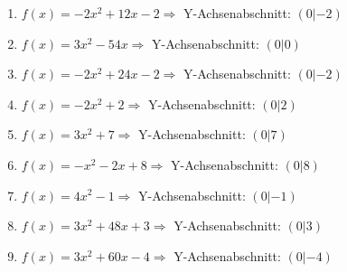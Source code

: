 \documentclass{article}%
\begin{document}
\begin{enumerate}[label=\alph*)]
\item%
\newline\vspace{0.5cm}$f(x)=-2x^2 + 12x - 2 \Rightarrow $ Y-Achsenabschnitt: $ (0|-2) $%
\item%
\newline\vspace{0.5cm}$f(x)=3x^2 - 54x \Rightarrow $ Y-Achsenabschnitt: $ (0|0) $%
\item%
\newline\vspace{0.5cm}$f(x)=-2x^2 + 24x - 2 \Rightarrow $ Y-Achsenabschnitt: $ (0|-2) $%
\item%
\newline\vspace{0.5cm}$f(x)=-2x^2 + 2 \Rightarrow $ Y-Achsenabschnitt: $ (0|2) $%
\item%
\newline\vspace{0.5cm}$f(x)=3x^2 + 7 \Rightarrow $ Y-Achsenabschnitt: $ (0|7) $%
\item%
\newline\vspace{0.5cm}$f(x)=-x^2 - 2x + 8 \Rightarrow $ Y-Achsenabschnitt: $ (0|8) $%
\item%
\newline\vspace{0.5cm}$f(x)=4x^2 - 1 \Rightarrow $ Y-Achsenabschnitt: $ (0|-1) $%
\item%
\newline\vspace{0.5cm}$f(x)=3x^2 + 48x + 3 \Rightarrow $ Y-Achsenabschnitt: $ (0|3) $%
\item%
\newline\vspace{0.5cm}$f(x)=3x^2 + 60x - 4 \Rightarrow $ Y-Achsenabschnitt: $ (0|-4) $%
\end{enumerate}

%
\end{document}
